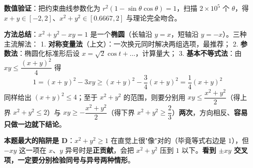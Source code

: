 \begin{answer}
\textbf{数值验证}：把约束曲线参数化为 $r^{2}(1-\sin\theta\cos\theta)=1$，扫描 $2\times10^{5}$ 个 $\theta$，得 $x+y\in[-2,2]$、$x^{2}+y^{2}\in[0.6667,2]$  与理论完全吻合。

\begin{gktip}
\textbf{方法总结}：$x^{2}+y^{2}-xy=1$ 是一个\textbf{椭圆}（长轴沿 $y=x$，短轴沿 $y=-x$）。三种主流解法：
1. \textbf{对称变量法}（上文）：一次换元同时解决两组选项，最推荐；
2. \textbf{参数法}：椭圆化标准形后设 $x=\sqrt2\cos t+\ldots$，计算量大；
3. \textbf{基本不等式法}：由 $xy\le\dfrac{(x+y)^{2}}4$ 得
\nopagebreak[4]
\[1=(x+y)^{2}-3xy\ge(x+y)^{2}-\frac34(x+y)^{2}=\frac14(x+y)^{2}\]
   同样给出 $(x+y)^{2}\le4$；至于 $x^{2}+y^{2}$ 的范围，则要分别用 $xy\le\dfrac{x^{2}+y^{2}}2$（得上界 $x^{2}+y^{2}\le2$）与 $xy\ge-\dfrac{x^{2}+y^{2}}2$（得下界 $x^{2}+y^{2}\ge\dfrac23$）\textbf{两次}，方向相反、\textbf{容易只做一边就下结论}。

\textbf{本题最大的陷阱是 D}：$x^{2}+y^{2}\ge1$ 在直觉上很"像"对的（毕竟等式右边是 $1$），但 $-xy$ 这一项在 $x$、$y$ 异号时是\textbf{正贡献}，会把 $x^{2}+y^{2}$ 压到 $1$ 以下。\textbf{看到 $\pm xy$ 交叉项，一定要分别检验同号与异号两种情形}。
\end{gktip}


\par\medskip

\end{answer}

